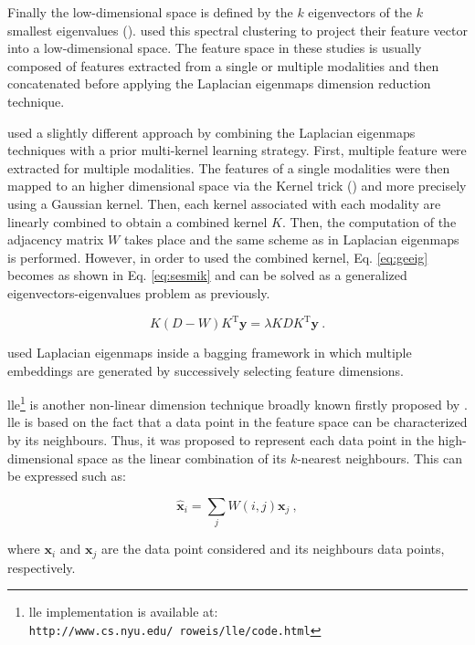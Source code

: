Finally the low-dimensional space is defined by the $k$ eigenvectors of the $k$ smallest eigenvalues (\cite{Belkin2001}). \cite{Tiwari2007,Tiwari2009,Tiwari2009a,Viswanath2008} used this spectral clustering to project their feature vector into a low-dimensional space. The feature space in these studies is usually composed of features extracted from a single or multiple modalities and then concatenated before applying the Laplacian eigenmaps dimension reduction technique.

\cite{Tiwari2009,Tiwari2013} used a slightly different approach by combining the Laplacian eigenmaps techniques with a prior multi-kernel learning strategy. First, multiple feature were extracted for multiple modalities. The features of a single modalities were then mapped to an higher dimensional space via the Kernel trick (\cite{Aizerman1964}) and more precisely using a Gaussian kernel. Then, each kernel associated with each modality are linearly combined to obtain a combined kernel $K$. Then, the computation of the adjacency matrix $W$ takes place and the same scheme as in Laplacian eigenmaps is performed. However, in order to used the combined kernel, Eq. \eqref{eq:geeig} becomes as shown in Eq. \eqref{eq:sesmik} and can be solved as a generalized eigenvectors-eigenvalues problem as previously.

\begin{equation}
	K (D-W) K^{\text{T}} \mathbf{y} = \lambda K D K^{\text{T}} \mathbf{y} \ .
	\label{eq:sesmik}
\end{equation}

\cite{Viswanath2011} used Laplacian eigenmaps inside a bagging framework in which multiple embeddings are generated by successively selecting feature dimensions.

\ac{lle}\footnote{\ac{lle} implementation is available at: \texttt{http://www.cs.nyu.edu/\allowbreak ~roweis/lle/code.html}} is another non-linear dimension technique broadly known firstly proposed by \cite{Roweis2000}. \ac{lle} is based on the fact that a data point in the feature space can be characterized by its neighbours. Thus, it was proposed to represent each data point in the high-dimensional space as the linear combination of its $k$-nearest neighbours. This can be expressed such as:

\begin{equation}
	\hat{\mathbf{x}}_i = \sum_j W(i,j) \mathbf{x}_j \ ,
	\label{eq:lincomlle}
\end{equation}

\noindent where $\mathbf{x}_i$ and $\mathbf{x}_j$ are the data point considered and its neighbours data points, respectively.

